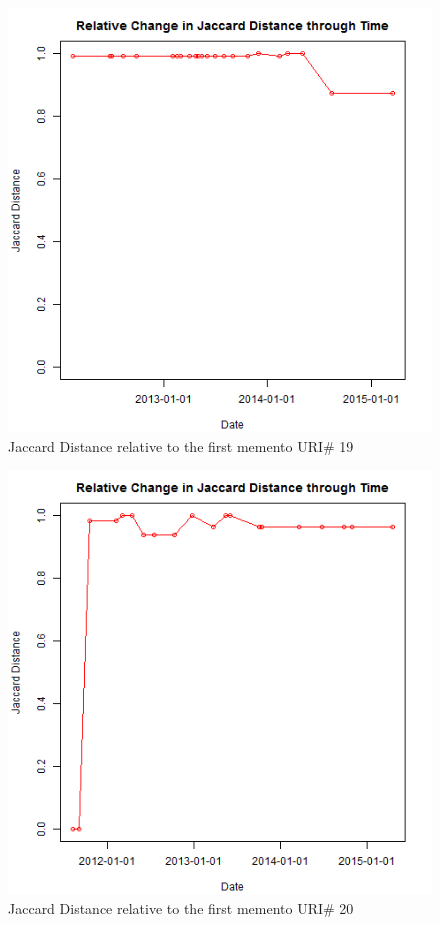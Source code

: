 \begin{figure}[ht]
	\begin{center}
		 \includegraphics[scale=0.60]{url19}
		  \caption{Jaccard Distance relative to the first memento URI\# 19}
	 \end{center}
\end{figure}
\begin{figure}[ht]
	\begin{center}
		 \includegraphics[scale=0.60]{url20}
		  \caption{Jaccard Distance relative to the first memento URI\# 20}
	 \end{center}
\end{figure}